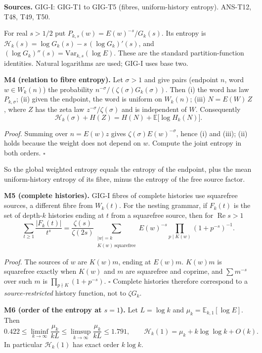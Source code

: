 \documentclass[
  11pt,
]{article}
\begin{document}
\textbf{Sources.} GIG-I: GIG-T1 to GIG-T5 (fibres, uniform-history
entropy). ANS-T12, T48, T49, T50.

For real \(s>1/2\) put \(P_{k,s}(w)=E(w)^{-s}/G_k(s)\). Its entropy is
\(\mathcal H_k(s)=\log G_k(s)-s\,(\log G_k)'(s)\), and
\((\log G_k)''(s)=\mathrm{Var}_{k,s}(\log E)\). These are the standard
partition-function identities. Natural logarithms are used; GIG-I uses
base two.

\textbf{M4 (relation to fibre entropy).} Let \(\sigma>1\) and give pairs
(endpoint \(n\), word \(w\in W_k(n)\)) the probability
\(n^{-\sigma}/(\zeta(\sigma)G_k(\sigma))\). Then (i) the word has law
\(P_{k,\sigma}\); (ii) given the endpoint, the word is uniform on
\(W_k(n)\); (iii) \(N=E(W)\,Z\), where \(Z\) has the zeta law
\(z^{-\sigma}/\zeta(\sigma)\) and is independent of \(W\). Consequently
\[\mathcal H_k(\sigma)+H(Z)=H(N)+\mathbb E\big[\log H_k(N)\big].\]

\emph{Proof.} Summing over \(n=E(w)z\) gives
\(\zeta(\sigma)E(w)^{-\sigma}\), hence (i) and (iii); (ii) holds because
the weight does not depend on \(w\). Compute the joint entropy in both
orders. \(\square\)

So the global weighted entropy equals the entropy of the endpoint, plus
the mean uniform-history entropy of its fibre, minus the entropy of the
free source factor.

\textbf{M5 (complete histories).} GIG-I fibres of complete histories use
squarefree sources, a different fibre from \(W_k(t)\). For the nesting
grammar, if \(F_{k}(t)\) is the set of depth-\(k\) histories ending at
\(t\) from a squarefree source, then for \(\operatorname{Re}s>1\)
\[\sum_{t\ge1}\frac{|F_k(t)|}{t^s}=\frac{\zeta(s)}{\zeta(2s)}\sum_{\substack{|w|=k\\K(w)\ \mathrm{squarefree}}}E(w)^{-s}\prod_{p\mid K(w)}(1+p^{-s})^{-1}.\]

\emph{Proof.} The sources of \(w\) are \(K(w)m\), ending at \(E(w)m\).
\(K(w)m\) is squarefree exactly when \(K(w)\) and \(m\) are squarefree
and coprime, and \(\sum m^{-s}\) over such \(m\) is
\(\prod_{p\nmid K}(1+p^{-s})\). \(\square\) Complete histories therefore
correspond to a \emph{source-restricted} history function, not to
\(\zeta G_k\).

\textbf{M6 (order of the entropy at \(s=1\)).} Let \(L=\log k\) and
\(\mu_k=\mathbb E_{k,1}[\log E]\). Then
\[0.422\le\liminf_{k\to\infty}\frac{\mu_k}{kL}\le\limsup_{k\to\infty}\frac{\mu_k}{kL}\le1.791,\qquad\mathcal H_k(1)=\mu_k+k\log\log k+O(k).\]
In particular \(\mathcal H_k(1)\) has exact order \(k\log k\).
\end{document}
